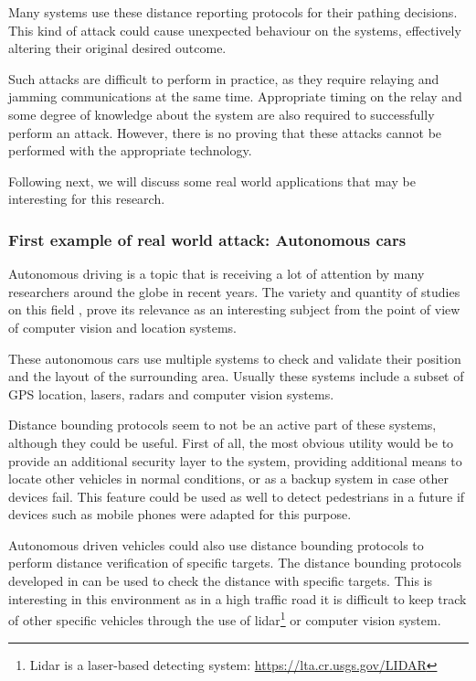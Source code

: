 \documentclass{article}
\begin{document}
Many systems use these distance reporting protocols for their pathing decisions. This kind of attack could cause unexpected behaviour on the systems, effectively altering their original desired outcome. 

Such attacks are difficult to perform in practice, as they require relaying and jamming communications at the same time. Appropriate timing on the relay and some degree of knowledge about the system are also required to successfully perform an attack. However, there is no proving that these attacks cannot be performed with the appropriate technology.

Following next, we will discuss some real world applications that may be interesting for this research.

\subsubsection{First example of real world attack: Autonomous cars}

Autonomous driving is a topic that is receiving a lot of attention by many researchers around the globe in recent years. The variety and quantity of studies on this field \cite{franke1999autonomous,continentalautonomous,levinsontowards,geiger2012we}, prove its relevance as an interesting subject from the point of view of computer vision and location systems.

These autonomous cars use multiple systems to check and validate their position and the layout of the surrounding area. Usually these systems include a subset of GPS location, lasers, radars and computer vision systems\cite{continentalautonomous,levinsontowards}.

Distance bounding protocols seem to not be an active part of these systems, although they could be useful. First of all, the most obvious utility would be to provide an additional security layer to the system, providing additional means to locate other vehicles in normal conditions, or as a backup system in case other devices fail. This feature could be used as well to detect pedestrians in a future if devices such as mobile phones were adapted for this purpose.

Autonomous driven vehicles could also use distance bounding protocols to perform distance verification of specific targets. The distance bounding protocols developed in  \cite{rasmussen2010realization, capkun2006secure} can be used to check the distance with specific targets. This is interesting in this environment as in a high traffic road it is difficult to keep track of other specific vehicles through the use of lidar\footnote{Lidar is a laser-based detecting system: \url{https://lta.cr.usgs.gov/LIDAR}} or computer vision system.
\end{document}

